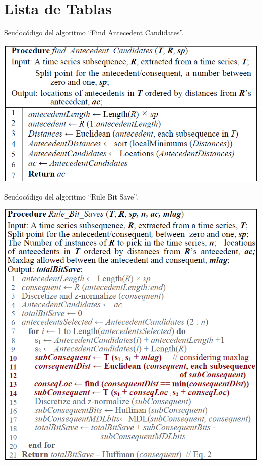 \section{Lista de Tablas}

\begin{table}[h]
\caption{Seudoc\'odigo del algoritmo \enquote{Find Antecedent Candidates}.}
\begin{center}
\includegraphics[scale=0.7]{antecedent.png}\\
\end{center}
\label{arm:table 1}
\end{table}

\begin{table}[h]
\caption{Seudoc\'odigo del algoritmo \enquote{Rule Bit Save}.}
\begin{center}
\includegraphics[scale=0.7]{rulebitsaves.png}\\
\end{center}
\label{arm:table 2}
\end{table}

